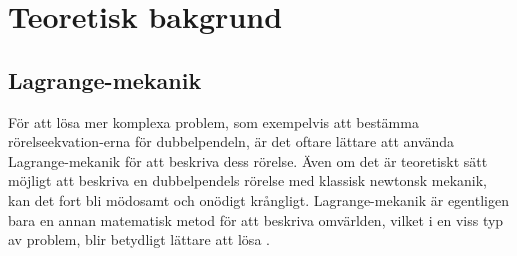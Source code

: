 \chapter{Teoretisk bakgrund}



\section{Lagrange-mekanik}

För att lösa mer komplexa problem, som exempelvis att bestämma rörelseekvation-erna för dubbelpendeln, är det oftare lättare att använda Lagrange-mekanik för att beskriva dess rörelse. Även om det är teoretiskt sätt möjligt att beskriva en dubbelpendels rörelse med klassisk newtonsk mekanik, kan det fort bli mödosamt och onödigt krångligt. Lagrange-mekanik är egentligen bara en annan matematisk metod för att beskriva omvärlden, vilket i en viss typ av problem, blir betydligt lättare att lösa \cite{book:classical_mechanics:Morin2007}.



